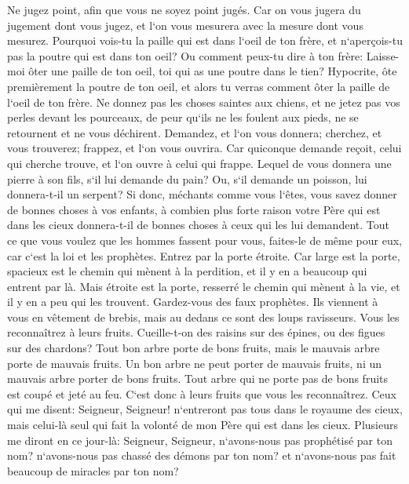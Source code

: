 \verse Ne jugez point, afin que vous ne soyez point jugés. 
\verse Car on vous jugera du jugement dont vous jugez, et l`on vous mesurera avec la mesure dont vous mesurez. 
\verse Pourquoi vois-tu la paille qui est dans l`oeil de ton frère, et n`aperçois-tu pas la poutre qui est dans ton oeil? 
\verse Ou comment peux-tu dire à ton frère: Laisse-moi ôter une paille de ton oeil, toi qui as une poutre dans le tien? 
\verse Hypocrite, ôte premièrement la poutre de ton oeil, et alors tu verras comment ôter la paille de l`oeil de ton frère. 
\verse Ne donnez pas les choses saintes aux chiens, et ne jetez pas vos perles devant les pourceaux, de peur qu`ils ne les foulent aux pieds, ne se retournent et ne vous déchirent. 
\verse Demandez, et l`on vous donnera; cherchez, et vous trouverez; frappez, et l`on vous ouvrira. 
\verse Car quiconque demande reçoit, celui qui cherche trouve, et l`on ouvre à celui qui frappe. 
\verse Lequel de vous donnera une pierre à son fils, s`il lui demande du pain? 
\verse Ou, s`il demande un poisson, lui donnera-t-il un serpent? 
\verse Si donc, méchants comme vous l`êtes, vous savez donner de bonnes choses à vos enfants, à combien plus forte raison votre Père qui est dans les cieux donnera-t-il de bonnes choses à ceux qui les lui demandent. 
\verse Tout ce que vous voulez que les hommes fassent pour vous, faites-le de même pour eux, car c`est la loi et les prophètes. 
\verse Entrez par la porte étroite. Car large est la porte, spacieux est le chemin qui mènent à la perdition, et il y en a beaucoup qui entrent par là. 
\verse Mais étroite est la porte, resserré le chemin qui mènent à la vie, et il y en a peu qui les trouvent. 
\verse Gardez-vous des faux prophètes. Ils viennent à vous en vêtement de brebis, mais au dedans ce sont des loups ravisseurs. 
\verse Vous les reconnaîtrez à leurs fruits. Cueille-t-on des raisins sur des épines, ou des figues sur des chardons? 
\verse Tout bon arbre porte de bons fruits, mais le mauvais arbre porte de mauvais fruits. 
\verse Un bon arbre ne peut porter de mauvais fruits, ni un mauvais arbre porter de bons fruits. 
\verse Tout arbre qui ne porte pas de bons fruits est coupé et jeté au feu. 
\verse C`est donc à leurs fruits que vous les reconnaîtrez. 
\verse Ceux qui me disent: Seigneur, Seigneur! n`entreront pas tous dans le royaume des cieux, mais celui-là seul qui fait la volonté de mon Père qui est dans les cieux. 
\verse Plusieurs me diront en ce jour-là: Seigneur, Seigneur, n`avons-nous pas prophétisé par ton nom? n`avons-nous pas chassé des démons par ton nom? et n`avons-nous pas fait beaucoup de miracles par ton nom? 

